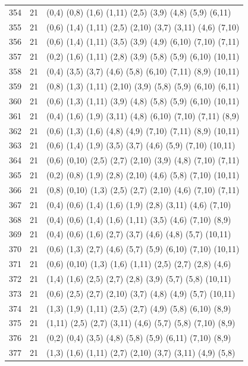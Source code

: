 {\begin{longtable}{lll}
354 & 21 & (0,4) (0,8) (1,6) (1,11) (2,5) (3,9) (4,8) (5,9) (6,11) \\
355 & 21 & (0,6) (1,4) (1,11) (2,5) (2,10) (3,7) (3,11) (4,6) (7,10) \\
356 & 21 & (0,6) (1,4) (1,11) (3,5) (3,9) (4,9) (6,10) (7,10) (7,11) \\
357 & 21 & (0,2) (1,6) (1,11) (2,8) (3,9) (5,8) (5,9) (6,10) (10,11) \\
358 & 21 & (0,4) (3,5) (3,7) (4,6) (5,8) (6,10) (7,11) (8,9) (10,11) \\
359 & 21 & (0,8) (1,3) (1,11) (2,10) (3,9) (5,8) (5,9) (6,10) (6,11) \\
360 & 21 & (0,6) (1,3) (1,11) (3,9) (4,8) (5,8) (5,9) (6,10) (10,11) \\
361 & 21 & (0,4) (1,6) (1,9) (3,11) (4,8) (6,10) (7,10) (7,11) (8,9) \\
362 & 21 & (0,6) (1,3) (1,6) (4,8) (4,9) (7,10) (7,11) (8,9) (10,11) \\
363 & 21 & (0,6) (1,4) (1,9) (3,5) (3,7) (4,6) (5,9) (7,10) (10,11) \\
364 & 21 & (0,6) (0,10) (2,5) (2,7) (2,10) (3,9) (4,8) (7,10) (7,11) \\
365 & 21 & (0,2) (0,8) (1,9) (2,8) (2,10) (4,6) (5,8) (7,10) (10,11) \\
366 & 21 & (0,8) (0,10) (1,3) (2,5) (2,7) (2,10) (4,6) (7,10) (7,11) \\
367 & 21 & (0,4) (0,6) (1,4) (1,6) (1,9) (2,8) (3,11) (4,6) (7,10) \\
368 & 21 & (0,4) (0,6) (1,4) (1,6) (1,11) (3,5) (4,6) (7,10) (8,9) \\
369 & 21 & (0,4) (0,6) (1,6) (2,7) (3,7) (4,6) (4,8) (5,7) (10,11) \\
370 & 21 & (0,6) (1,3) (2,7) (4,6) (5,7) (5,9) (6,10) (7,10) (10,11) \\
371 & 21 & (0,6) (0,10) (1,3) (1,6) (1,11) (2,5) (2,7) (2,8) (4,6) \\
372 & 21 & (1,4) (1,6) (2,5) (2,7) (2,8) (3,9) (5,7) (5,8) (10,11) \\
373 & 21 & (0,6) (2,5) (2,7) (2,10) (3,7) (4,8) (4,9) (5,7) (10,11) \\
374 & 21 & (1,3) (1,9) (1,11) (2,5) (2,7) (4,9) (5,8) (6,10) (8,9) \\
375 & 21 & (1,11) (2,5) (2,7) (3,11) (4,6) (5,7) (5,8) (7,10) (8,9) \\
376 & 21 & (0,2) (0,4) (3,5) (4,8) (5,8) (5,9) (6,11) (7,10) (8,9) \\
377 & 21 & (1,3) (1,6) (1,11) (2,7) (2,10) (3,7) (3,11) (4,9) (5,8) \\

\end{longtable}}
